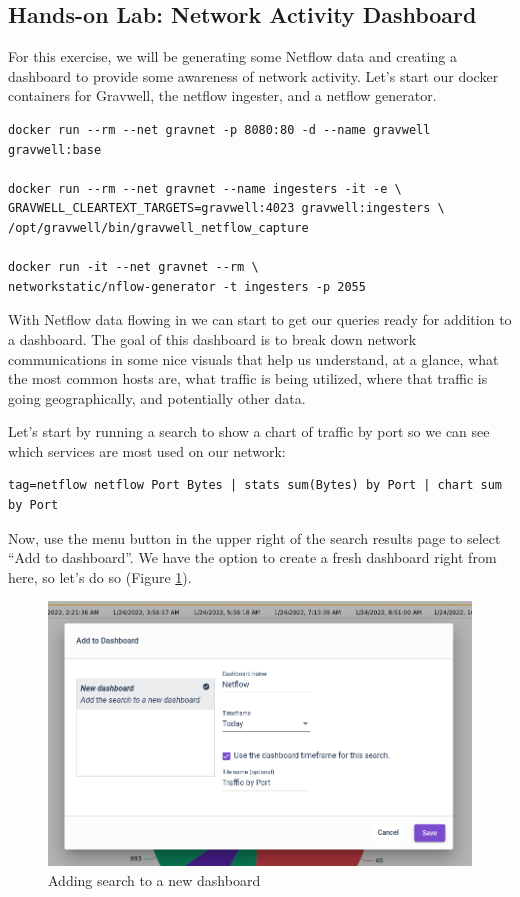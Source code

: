 \clearpage
\subsection{Hands-on Lab: Network Activity Dashboard}
\label{lab:dashboard}

For this exercise, we will be generating some Netflow data and creating
a dashboard to provide some awareness of network activity. Let's start
our docker containers for Gravwell, the netflow ingester, and a netflow
generator.

\begin{Verbatim}[breaklines=true]
docker run --rm --net gravnet -p 8080:80 -d --name gravwell gravwell:base

docker run --rm --net gravnet --name ingesters -it -e \
GRAVWELL_CLEARTEXT_TARGETS=gravwell:4023 gravwell:ingesters \
/opt/gravwell/bin/gravwell_netflow_capture

docker run -it --net gravnet --rm \
networkstatic/nflow-generator -t ingesters -p 2055
\end{Verbatim}

With Netflow data flowing in we can start to get our queries ready for
addition to a dashboard. The goal of this dashboard is to break down
network communications in some nice visuals that help us understand, at
a glance, what the most common hosts are, what traffic is being
utilized, where that traffic is going geographically, and potentially
other data.

Let's start by running a search to show a chart of traffic by port so we can
see which services are most used on our network:

\begin{Verbatim}[breaklines=true]
tag=netflow netflow Port Bytes | stats sum(Bytes) by Port | chart sum by Port
\end{Verbatim}

Now, use the menu button in the upper right of the search results page to select ``Add to
dashboard''. We have the option to create a fresh dashboard right from
here, so let's do so (Figure \ref{fig:new-dashboard}).

\begin{figure}
	\includegraphics[width=0.7\linewidth]{images/new-dashboard.png}
	\caption{Adding search to a new dashboard}
	\label{fig:new-dashboard}
\end{figure}

